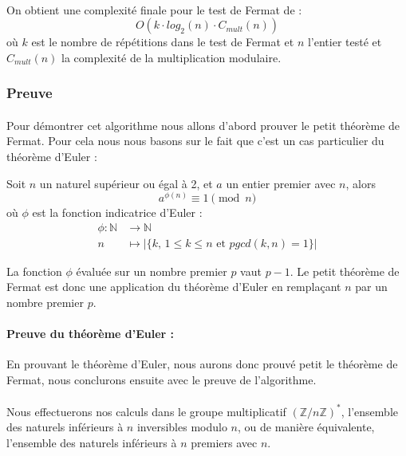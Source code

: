 		\paragraph{}On obtient une complexité finale pour le test de Fermat de :
		\[O(k \cdot log_{2}(n) \cdot C_{mult}(n))\]
		où $k$ est le nombre de répétitions dans le test de Fermat et $n$ l'entier testé et $C_{mult}(n)$ la complexité de la multiplication modulaire.
	
	
	\subsubsection{Preuve}
		\paragraph{}Pour démontrer cet algorithme nous allons d'abord prouver le petit théorème de Fermat. Pour cela nous nous basons sur le fait que c'est un cas particulier du théorème d'Euler :
		
		\vspace{-1.5em}\begin{adjustwidth}{1.5cm}{1.5cm} 
		\begin{Th}
			\label{ThEuler}
			Soit $n$ un naturel supérieur ou égal à 2, et $a$ un entier premier avec $n$, alors
			\[a^{\phi(n)}\equiv 1 \pmod n\]
			où $\phi$ est la fonction indicatrice d'Euler :
			\begin{align*}
				\phi \colon \mathbb{N} &\to \mathbb{N}\\
				n &\mapsto | \{k \text{, } 1 \leq k \leq n \text{ et } pgcd(k,n) = 1\} |
			\end{align*}
		\end{Th}
		\end{adjustwidth}\vspace{0.5em}
		
		La fonction $\phi$ évaluée sur un nombre premier $p$ vaut $p - 1$. Le petit théorème de Fermat est donc une application du théorème d'Euler en remplaçant $n$ par un nombre premier $p$.
		
		\paragraph{Preuve du théorème d'Euler :\\}
			En prouvant le théorème d'Euler, nous aurons donc prouvé petit le théorème de Fermat, nous conclurons ensuite avec le preuve de l'algorithme.
			\paragraph{}Nous effectuerons nos calculs dans le groupe multiplicatif $(\mathbb{Z}/n\mathbb{Z})^*$, l'ensemble des naturels inférieurs à $n$ inversibles modulo $n$, ou de manière équivalente, l'ensemble des naturels inférieurs à $n$ premiers avec $n$.
			
